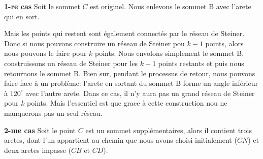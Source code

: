 \documentclass[10pt,a4paper]{article}%
\theoremstyle{theorem}
\theoremstyle{definition}
\begin{document}
	        	\textbf{1-re cas} Soit le sommet $C$ est originel. Nous enlevons le sommet B avec l'arete qui en sort. 
	        	\begin{center}
	        	\end{center}
        		
        		Mais les points qui restent sont également connectés par le réseau de Steiner. Donc si nous pouvons construire un réseau de Steiner pou $k-1$ points, alors nous pouvons le faire pour $k$ points.  Nous envolons simplement le sommet B, construissons un réseau de Steiner pour les $k-1$ points restants et puis nous retournons le sommet B. Bien sur, pendant le processus de retour, nous pouvons faire face à un problème: l'arete en sortant du sommet B forme un angle inférieur à $120^\circ$ avec l'autre arete. Dans ce cas, il n'y aura pas un grand réseau de Steiner pour $k$ points. Mais l'essentiel est que grace à cette construction nou ne manquerons pas un seul réseau. 
        		
        		\textbf{2-me cas} Soit le point $C$ est un sommet supplémentaires, alors il contient trois aretes, dont l'un appartient au chemin que nous avons choisi initialement ($CN$) et deux aretes impasse ($CB$ et $CD$).
        		
\end{document}
